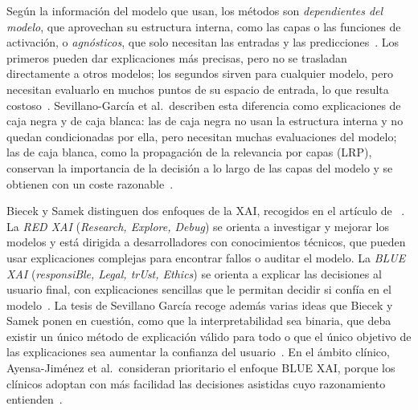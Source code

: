 Según la información del modelo que usan, los métodos son \emph{dependientes del
modelo}, que aprovechan su estructura interna, como las capas o las funciones de
activación, o \emph{agnósticos}, que solo necesitan las entradas y las
predicciones~\cite{sevillano2025tesis,barredo2020}. Los primeros pueden dar
explicaciones más precisas, pero no se trasladan directamente a otros modelos;
los segundos sirven para cualquier modelo, pero necesitan evaluarlo en muchos
puntos de su espacio de entrada, lo que resulta
costoso~\cite{sevillano2025tesis}. Sevillano-García et al.\ describen esta
diferencia como explicaciones de caja negra y de caja blanca: las de caja negra no
usan la estructura interna y no quedan condicionadas por ella, pero necesitan
muchas evaluaciones del modelo; las de caja blanca, como la propagación de la
relevancia por capas (LRP), conservan la importancia de la decisión a lo largo de
las capas del modelo y se obtienen con un coste
razonable~\cite{sevillano2026}.

Biecek y Samek distinguen dos enfoques de la XAI, recogidos en el artículo de
\stoodx~\cite{sevillano2026}. La \emph{RED XAI} (\emph{Research, Explore, Debug})
se orienta a investigar y mejorar los modelos y está dirigida a desarrolladores
con conocimientos técnicos, que pueden usar explicaciones complejas para
encontrar fallos o auditar el modelo. La \emph{BLUE XAI} (\emph{responsiBle, Legal,
trUst, Ethics}) se orienta a explicar las decisiones al usuario final, con
explicaciones sencillas que le permitan decidir si confía en el
modelo~\cite{sevillano2026,sevillano2025tesis}. La tesis de Sevillano García
recoge además varias ideas que Biecek y Samek ponen en cuestión, como
que la interpretabilidad sea binaria, que deba existir un único método de
explicación válido para todo o que el único objetivo de las explicaciones sea
aumentar la confianza del usuario~\cite{sevillano2025tesis}. En el ámbito
clínico, Ayensa-Jiménez et al.\ consideran prioritario el enfoque BLUE XAI,
porque los clínicos adoptan con más facilidad las decisiones asistidas cuyo
razonamiento entienden~\cite{ayensa2026}.

